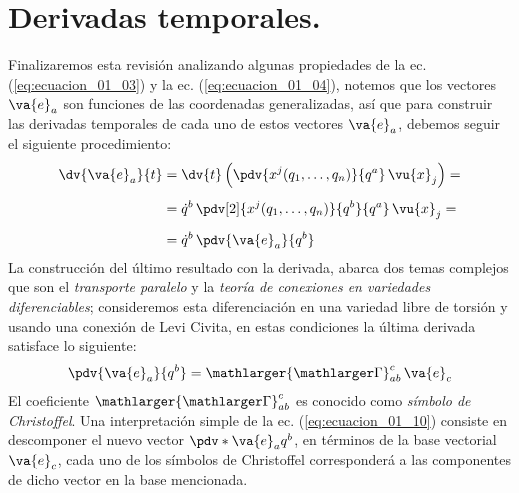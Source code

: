 \section{Derivadas temporales.}

Finalizaremos esta revisión analizando algunas propiedades de la ec.(\ref{eq:ecuacion_01_03}) y la ec. (\ref{eq:ecuacion_01_04}), notemos que los vectores $\va{e}_{a}$ son funciones de las coordenadas generalizadas, así que para construir las derivadas temporales de cada uno de estos vectores $\va{e}_{a}$, debemos seguir el siguiente procedimiento:
\begin{align}
\begin{aligned}[b]
\dv{\va{e}_{a}}{t} &= \dv{t} \left( \pdv{x^{j} (q_{1}, \ldots, q_{n})}{q^{a}} \, \vu{x}_{j} \right) = \\[0.5em]
&= \dot{q}^{b} \, \pdv[2]{x^{j} (q_{1}, \ldots, q_{n})}{q^{b}}{q^{a}} \, \vu{x}_{j} = \\[0.5em]
&= \dot{q}^{b} \, \pdv{\va{e}_{a}}{q^{b}}
\end{aligned}
\label{eq:ecuacion_01_09}
\end{align}
La construcción del último resultado con la derivada, abarca dos temas complejos que son el \emph{transporte paralelo} y la \emph{teoría de conexiones en variedades diferenciables}; consideremos esta diferenciación en una variedad libre de torsión y usando una conexión de Levi Civita, en estas condiciones la última derivada satisface lo siguiente:
\begin{align}
\pdv{\va{e}_{a}}{q^{b}} = {\mathlarger{\mathlarger\Gamma}}_{ab}^{c} \, \va{e}_{c}
\label{eq:ecuacion_01_10}
\end{align}
El coeficiente ${\mathlarger{\mathlarger\Gamma}}_{ab}^{c}$ es conocido como \emph{símbolo de Christoffel}. Una interpretación simple de la ec. (\ref{eq:ecuacion_01_10}) consiste en descomponer el nuevo vector $\pdv*{\va{e}_{a}}{q^{b}}$, en términos de la base vectorial $\va{e}_{c}$, cada uno de los símbolos de Christoffel corresponderá a las componentes de dicho vector en la base mencionada.
\vfill
\begin{thebibliography}{X}
\end{thebibliography}
